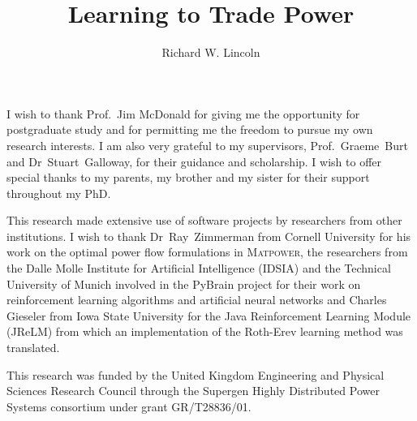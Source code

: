 \documentclass[12pt]{strath_thesis}
\title{Learning to Trade Power}
\author{Richard W. Lincoln}
\begin{document}
\maketitle

\setcounter{page}{1}

\declaration

\begin{acknowledgements}
I wish to thank Prof.~Jim McDonald for giving me the opportunity for
postgraduate study and for permitting me the freedom to pursue my own research
interests.  I am also very grateful to my supervisors, Prof.~Graeme~Burt and
Dr~Stuart~Galloway, for their guidance and scholarship.  I wish to offer
special thanks to my parents, my brother and my sister for their support
throughout my PhD.

This research made extensive use of software projects by researchers from other
institutions.  I wish to thank Dr~Ray~Zimmerman
from Cornell University for his work on the optimal power flow formulations in
\textsc{Matpower}, the researchers from the Dalle Molle Institute for
Artificial Intelligence (IDSIA) and the Technical University of Munich
involved in the PyBrain project for their work on reinforcement learning
algorithms and artificial neural networks and Charles Gieseler from Iowa State
University for the Java Reinforcement Learning Module (JReLM) from which an
implementation of the Roth-Erev learning method was translated.

This research was funded by the United Kingdom Engineering and Physical
Sciences Research Council through the Supergen Highly Distributed Power
Systems consortium under grant GR/T28836/01.
\end{acknowledgements}
\end{document}
